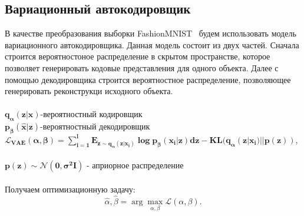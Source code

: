 \subsection{Вариационный автокодировщик}
В качестве преобразования выборки FashionMNIST~\cite{FMNIST} будем использовать модель вариационного автокодировщика. Данная модель состоит из двух частей. Сначала строится вероятностоное распределение в скрытом пространстве, которое позволяет генерировать кодовые представления для одного объекта. Далее с помощью декодировщика строится вероятностное распределение, позволяющее генерировать реконструкци исходного объекта.\\
\\
$\mathbf{q_{\alpha}(z|x)}$-вероятностный кодировщик\\
$\mathbf{p_{\beta}(\hat{x}|z)}$-вероятностный декодировщик\\
$\mathbf{\mathcal{L}_{\text{VAE}}(\alpha, \beta)=\sum\limits_{i=1}^{l}\text{E}_{z\sim q_{\alpha}(z|x_{i})}\log{p_{\beta}(x_{i}|z)}dz-\text{KL}(q_{\alpha}(z|x_{i})||p(z))}$,\\
\\
$\mathbf{p(z)\sim \mathcal{N}(0,\sigma^{2}\mathbf{I})}$ - априорное распределение\\
\\
Получаем оптимизационную задачу:
$$\hat{\alpha}, \hat{\beta} = \arg\max_{\alpha, \beta} \mathcal{L}(\alpha, \beta).$$

\newpage
